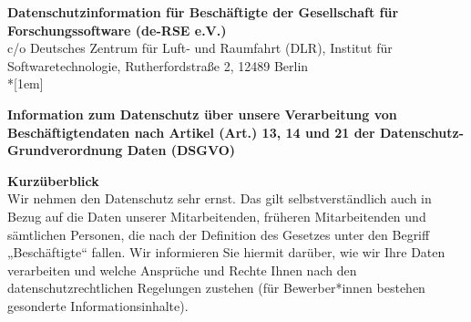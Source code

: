\documentclass[a4paper, fontsize=11pt]{scrartcl}
\begin{document}

\thispagestyle{headings}
\vspace{-8.5cm}
\begin{centering}
{\large\textbf{Datenschutzinformation für Beschäftigte der Gesellschaft für Forschungssoftware (de-RSE e.V.)}}\\
{\tiny c/o Deutsches Zentrum für Luft- und Raumfahrt (DLR), Institut für Softwaretechnologie, Rutherfordstraße 2, 12489 Berlin}\\*[1em]
\end{centering}
\vspace{0.5cm}
{\large\textbf{Information zum Datenschutz über unsere Verarbeitung von Beschäftigtendaten  nach Artikel (Art.) 13, 14 und 21 der Datenschutz-Grundverordnung Daten (DSGVO)}}

\vspace{0.5cm}
{\large\textbf{Kurzüberblick}} \\
Wir nehmen den Datenschutz sehr ernst. Das gilt selbstverständlich auch in Bezug auf die Daten unserer Mitarbeitenden, früheren Mitarbeitenden und sämtlichen Personen, die nach der Definition des Gesetzes unter den Begriff „Beschäftigte“ fallen. Wir informieren Sie hiermit darüber, wie wir Ihre Daten verarbeiten und welche Ansprüche und Rechte Ihnen nach den datenschutzrechtlichen Regelungen zustehen (für Bewerber*innen bestehen gesonderte Informationsinhalte).
\end{document}
